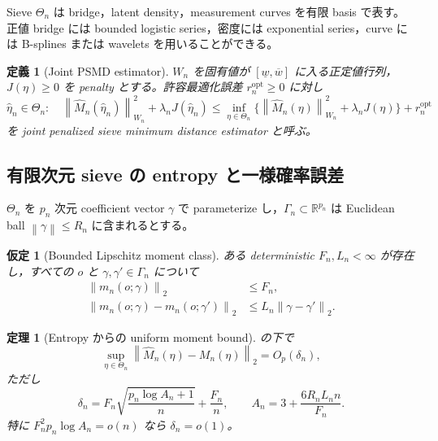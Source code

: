 \documentclass[11pt,a4paper]{ltjsarticle}
\newtheorem{assumption}{仮定}[section]
\newtheorem{definition}{定義}[section]
\newtheorem{theorem}{定理}[section]
\theoremstyle{remark}
\newcommand{\R}{\mathbb R}
\newcommand{\wh}{\widehat}
\newcommand{\norm}[1]{\left\lVert#1\right\rVert}
\begin{document}
Sieve $\Theta_n$ は bridge，latent density，measurement curves を有限 basis で表す。正値 bridge には bounded logistic series，密度には exponential series，curve には B-splines または wavelets を用いることができる。

\begin{definition}[Joint PSMD estimator]\label{def:jointpsmd2}
$W_n$ を固有値が $[\underline w,\overline w]$ に入る正定値行列，$J(\eta)\ge0$ を penalty とする。許容最適化誤差 $r_n^{\mathrm{opt}}\ge0$ に対し
\begin{equation}
\wh\eta_n\in\Theta_n:\quad
\norm{\wh M_n(\wh\eta_n)}_{W_n}^2+\lambda_nJ(\wh\eta_n)
\le
\inf_{\eta\in\Theta_n}
\{\norm{\wh M_n(\eta)}_{W_n}^2+\lambda_nJ(\eta)\}
+r_n^{\mathrm{opt}}
\label{eq:psmd2}
\end{equation}
を joint penalized sieve minimum distance estimator と呼ぶ。
\end{definition}

\subsection{有限次元 sieve の entropy と一様確率誤差}
$\Theta_n$ を $p_n$ 次元 coefficient vector $\gamma$ で parameterize し，$\Gamma_n\subset\R^{p_n}$ は Euclidean ball $\norm\gamma\le R_n$ に含まれるとする。

\begin{assumption}[Bounded Lipschitz moment class]\label{as:boundedlip}
ある deterministic $F_n,L_n<\infty$ が存在し，すべての $o$ と $\gamma,\gamma'\in\Gamma_n$ について
\begin{align}
\norm{m_n(o;\gamma)}_2&\le F_n,
\label{eq:boundm}\\
\norm{m_n(o;\gamma)-m_n(o;\gamma')}_2
&\le L_n\norm{\gamma-\gamma'}_2.
\label{eq:lipm}
\end{align}
\end{assumption}

\begin{theorem}[Entropy からの uniform moment bound]\label{thm:entropy}
の下で
\begin{equation}
\sup_{\eta\in\Theta_n}
\norm{\wh M_n(\eta)-M_n(\eta)}_2
=O_p(\delta_n),
\label{eq:uniformrate}
\end{equation}
ただし
\begin{equation}
\delta_n
=F_n\sqrt{\frac{p_n\log A_n+1}{n}}
+\frac{F_n}{n},
\qquad
A_n=3+\frac{6R_nL_nn}{F_n}.
\label{eq:deltan}
\end{equation}
特に $F_n^2p_n\log A_n=o(n)$ なら $\delta_n=o(1)$。
\end{theorem}
\end{document}
